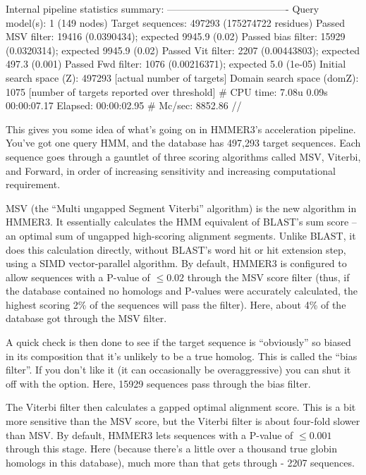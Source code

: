 \begin{sreoutput}
Internal pipeline statistics summary:
-------------------------------------
Query model(s):                            1  (149 nodes)
Target sequences:                     497293  (175274722 residues)
Passed MSV filter:                     19416  (0.0390434); expected 9945.9 (0.02)
Passed bias filter:                    15929  (0.0320314); expected 9945.9 (0.02)
Passed Vit filter:                      2207  (0.00443803); expected 497.3 (0.001)
Passed Fwd filter:                      1076  (0.00216371); expected 5.0 (1e-05)
Initial search space (Z):             497293  [actual number of targets]
Domain search space  (domZ):            1075  [number of targets reported over threshold]
# CPU time: 7.08u 0.09s 00:00:07.17 Elapsed: 00:00:02.95
# Mc/sec: 8852.86
//
\end{sreoutput}

This gives you some idea of what's going on in HMMER3's acceleration
pipeline. You've got one query HMM, and the database has 497,293
target sequences. Each sequence goes through a gauntlet of three
scoring algorithms called MSV, Viterbi, and Forward, in order of 
increasing sensitivity and increasing computational requirement. 

MSV (the ``Multi ungapped Segment Viterbi'' algorithm) is the new
algorithm in HMMER3. It essentially calculates the HMM equivalent of
BLAST's sum score -- an optimal sum of ungapped high-scoring alignment
segments. Unlike BLAST, it does this calculation directly, without
BLAST's word hit or hit extension step, using a SIMD vector-parallel
algorithm. By default, HMMER3 is configured to allow sequences with a
P-value of $\leq 0.02$ through the MSV score filter (thus, if the
database contained no homologs and P-values were accurately
calculated, the highest scoring 2\% of the sequences will pass the
filter). Here, about 4\% of the database got through the MSV filter.

A quick check is then done to see if the target sequence is
``obviously'' so biased in its composition that it's unlikely to be a
true homolog. This is called the ``bias filter''. If you don't like it
(it can occasionally be overaggressive) you can shut it off with the
 option. Here, 15929 sequences pass through the bias
filter.

The Viterbi filter then calculates a gapped optimal alignment score.
This is a bit more sensitive than the MSV score, but the Viterbi
filter is about four-fold slower than MSV. By default, HMMER3 lets
sequences with a P-value of $\leq 0.001$ through this stage. Here
(because there's a little over a thousand true globin homologs in this
database), much more than that gets through - 2207 sequences.

